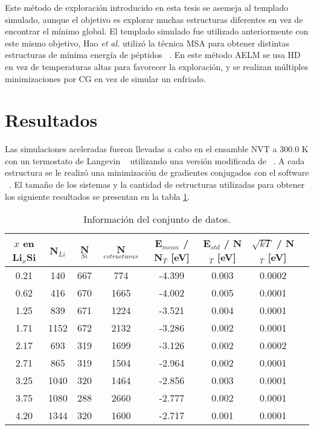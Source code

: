 Este método de exploración introducido en esta tesis se asemeja al templado
simulado, aunque el objetivo es explorar muchas estructuras diferentes en vez de 
encontrar el mínimo global. El templado simulado fue utilizado anteriormente
con este mismo objetivo, Hao \textit{et al.} utilizó la técnica MSA para obtener
distintas estructuras de mínima energía de péptidos ~\cite{hao2015}. En este 
método AELM se usa HD en vez de temperaturas altas para favorecer la exploración,
y se realizan múltiples minimizaciones por CG en vez de simular un enfriado. 


\section{Resultados}

Las simulaciones aceleradas fueron llevadas a cabo en el ensamble NVT a 300.0 K
con un termostato de Langevin ~\cite{schneider1978} utilizando una versión 
modificada de  ~\cite{gems}. A cada estructura se le realizó una 
minimización de gradientes conjugados con el software  
~\cite{lammps1, lammps2}. El tamaño de los sistemas y la cantidad de estructuras 
utilizadas para obtener los siguiente resultados se presentan en la tabla 
\ref{t:siminfo}.
\begin{table}[h]
    \centering
    \caption{Información del conjunto de datos.}
    \begin{tabular}{cccccccc}
    \hline
    $x$ en Li$_{x}$Si & N$_{Li}$ & N$_{Si}$ & N$_{estructuras}$ & E$_{mean}$ / N$_T$ [eV] & E$_{std}$ / N$_T$ [eV] & $\sqrt{kT}$ / N$_T$ [eV] \\
    \hline
    0.21 & 140 & 667 & 774 & -4.399 & 0.003 & 0.0002 \\
    0.62 & 416 & 670 & 1665 & -4.002 & 0.005 & 0.0001 \\
    1.25 & 839 & 671 & 1224 & -3.521 & 0.004 & 0.0001 \\
    1.71 & 1152 & 672 & 2132 & -3.286 & 0.002 & 0.0001 \\
    2.17 & 693 & 319 & 1699 & -3.126 & 0.002 & 0.0002 \\
    2.71 & 865 & 319 & 1504 & -2.964 & 0.002 & 0.0001 \\
    3.25 & 1040 & 320 & 1464 & -2.856 & 0.003 & 0.0001 \\
    3.75 & 1080 & 288 & 2660 & -2.777 & 0.002 & 0.0001 \\
    4.20 & 1344 & 320 & 1600 & -2.717 & 0.001 & 0.0001 \\
    \hline
    \end{tabular}
    \label{t:siminfo}
\end{table}

